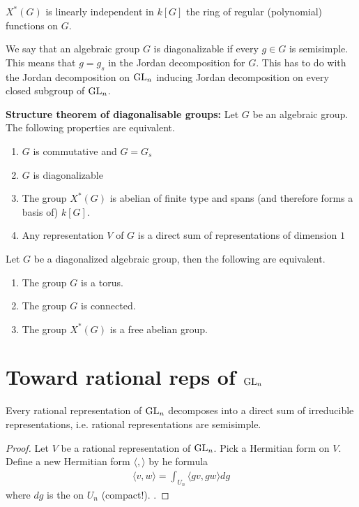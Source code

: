 \documentclass[12pt]{article}
\begin{document}
\begin{corollary}
    $X^*(G)$ is linearly independent in $k[G]$ the ring of regular (polynomial) functions on $G$.
\end{corollary}
\begin{definition}
    We say that an algebraic group $G$ is diagonalizable if every $g\in G$ is semisimple. This means that $g =g_s$ in the Jordan decomposition for $G$. This has to do with the Jordan decomposition on $\operatorname{GL}_n$ inducing Jordan decomposition on every closed subgroup of $\operatorname{GL}_n$.
\end{definition}
\begin{theorem}
    \textbf{Structure theorem of diagonalisable groups:} Let $G$ be an algebraic group. The following properties are equivalent. \begin{enumerate}
        \item $G$ is commutative and $G = G_s$
        \item $G$ is diagonalizable 
        \item The group $X^*(G)$ is abelian of finite type and spans (and therefore forms a basis of) $k[G]$.
        \item Any representation $V$ of $G$ is a direct sum of representations of dimension $1$
    \end{enumerate}
\end{theorem}
\begin{proposition}
    Let $G$ be a diagonalized algebraic group, then the following are equivalent.\begin{enumerate}
        \item The group $G$ is a torus.
        \item The group $G$ is connected.
        \item The group $X^*(G)$ is a free abelian group.
    \end{enumerate}
\end{proposition}

\section{Toward rational reps of $\operatorname{GL}_n$}
\begin{theorem}
    Every rational representation of $\operatorname{GL}_n$ decomposes into a direct sum of irreducible representations, i.e. rational representations are semisimple.
\end{theorem}
\begin{proof}
    Let $V$ be a rational representation of $\operatorname{GL}_n$. Pick a Hermitian form on $V$. Define a new Hermitian form $\langle,\rangle$ by he formula \begin{align*}
        \langle v,w\rangle = \int_{U_n}\langle gv, gw\rangle dg
    \end{align*} where $dg$ is the  on $U_n$ (compact!). .
\end{proof}
\end{document}
